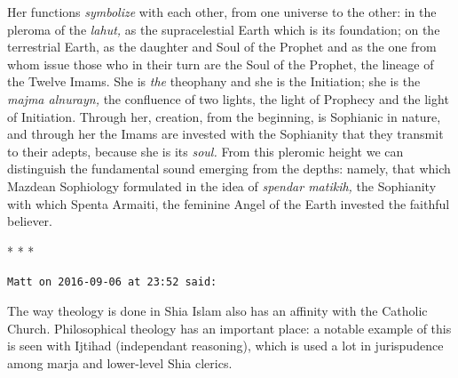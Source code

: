 \begin{quotationx}
Her functions \emph{symbolize} with each other, from one universe to the other: in the pleroma of the \emph{lahut,} as the supracelestial Earth which is its foundation; on the terrestrial Earth, as the daughter and Soul of the Prophet and as the one from whom issue those who in their turn are the Soul of the Prophet, the lineage of the Twelve Imams. She is \emph{the} theophany and she is the Initiation; she is the \emph{majma alnurayn,} the confluence of two lights, the light of Prophecy and the light of Initiation. Through her, creation, from the beginning, is Sophianic in nature, and through her the Imams are invested with the Sophianity that they transmit to their adepts, because she is its \emph{soul.} From this pleromic height we can distinguish the fundamental sound emerging from the depths: namely, that which Mazdean Sophiology formulated in the idea of \emph{spendar matikih,} the Sophianity with which Spenta Armaiti, the feminine Angel of the Earth invested the faithful believer.
\end{quotationx}


\begin{center}* * *\end{center}

\begin{footnotesize}
\begin{sffamily}
\texttt{Matt on 2016-09-06 at 23:52 said:}

The way theology is done in Shia Islam also has an affinity with the Catholic Church. Philosophical theology has an important place: a notable example of this is seen with Ijtihad (independant reasoning), which is used a lot in jurispudence among marja and lower-level Shia clerics.

\hfill

\end{sffamily}
\end{footnotesize}

